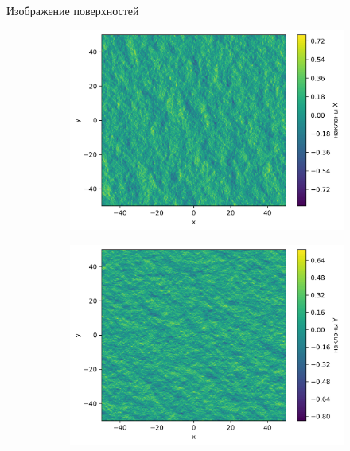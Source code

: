 \documentclass[10pt,pdf,hyperref={unicode}, dvipsnames]{beamer}
\begin{document}
\begin{frame}[t]{Изображение поверхностей}
\begin{figure}[h]
\begin{subfigure}{0.49\linewidth}
            \includegraphics[width=1\linewidth]{img/slopesxx.png}
        \end{subfigure}
        \begin{subfigure}{0.49\linewidth}
            \centering
            \includegraphics[width=1\linewidth]{img/slopesyy}
        \end{subfigure}
    \end{figure}    
\end{frame}
\end{document}

